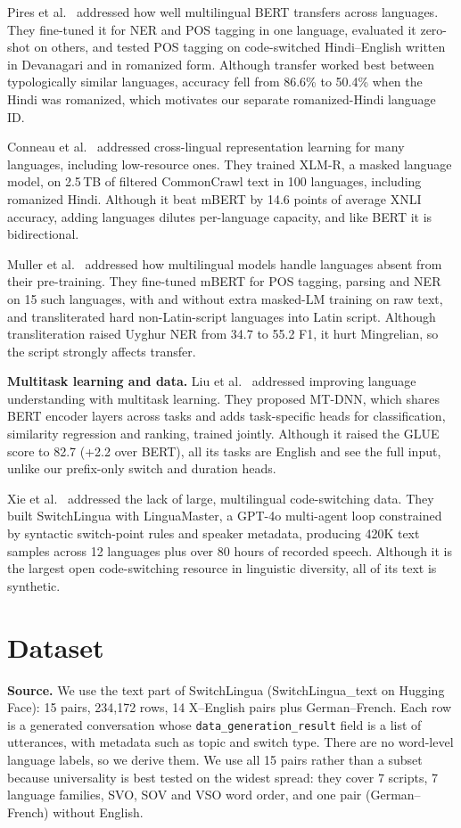\documentclass[sigconf]{acmart}
\begin{document}
Pires et al.~\cite{pires2019multilingual} addressed how well multilingual BERT transfers across languages. They
fine-tuned it for NER and POS tagging in one language, evaluated it zero-shot on others, and tested POS tagging on
code-switched Hindi--English written in Devanagari and in romanized form. Although transfer worked best between
typologically similar languages, accuracy fell from 86.6\% to 50.4\% when the Hindi was romanized, which motivates our
separate romanized-Hindi language ID.

Conneau et al.~\cite{conneau2020xlmr} addressed cross-lingual representation learning for many languages, including
low-resource ones. They trained XLM-R, a masked language model, on 2.5\,TB of filtered CommonCrawl text in 100
languages, including romanized Hindi. Although it beat mBERT by 14.6 points of average XNLI accuracy, adding languages
dilutes per-language capacity, and like BERT it is bidirectional.

Muller et al.~\cite{muller2021unseen} addressed how multilingual models handle languages absent from their
pre-training. They fine-tuned mBERT for POS tagging, parsing and NER on 15 such languages, with and without extra
masked-LM training on raw text, and transliterated hard non-Latin-script languages into Latin script. Although
transliteration raised Uyghur NER from 34.7 to 55.2 F1, it hurt Mingrelian, so the script strongly affects transfer.

\textbf{Multitask learning and data.} Liu et al.~\cite{liu2019mtdnn} addressed improving language understanding with
multitask learning. They proposed MT-DNN, which shares BERT encoder layers across tasks and adds task-specific heads
for classification, similarity regression and ranking, trained jointly. Although it raised the GLUE score to 82.7
(+2.2 over BERT), all its tasks are English and see the full input, unlike our prefix-only switch and duration heads.

Xie et al.~\cite{xie2025switchlingua} addressed the lack of large, multilingual code-switching data. They built
SwitchLingua with LinguaMaster, a GPT-4o multi-agent loop constrained by syntactic switch-point rules and speaker
metadata, producing 420K text samples across 12 languages plus over 80 hours of recorded speech. Although it is the
largest open code-switching resource in linguistic diversity, all of its text is synthetic.

\section{Dataset}
\textbf{Source.} We use the text part of SwitchLingua (SwitchLingua\_text on Hugging Face): 15 pairs,
234,172 rows, 14 X--English pairs plus German--French. Each row is a generated conversation whose
\texttt{data\_generation\_result} field is a list of utterances, with metadata such as topic and switch type. There are
no word-level language labels, so we derive them. We use all 15 pairs rather than a subset because universality is
best tested on the widest spread: they cover 7 scripts, 7 language families, SVO, SOV and VSO word order, and one
pair (German--French) without English.
\end{document}
